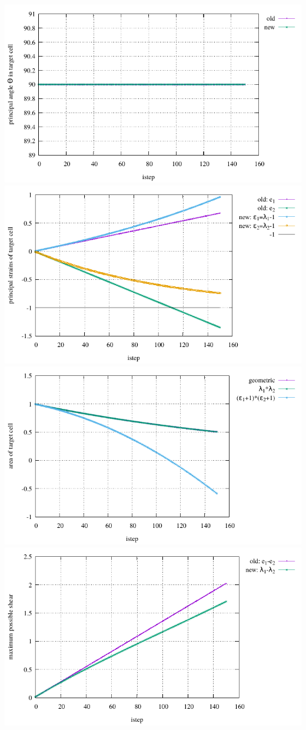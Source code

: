 \begin{center}
\includegraphics[width=9.cm]{python_codes/fieldstone_89/results/biaxial/principal_angle.pdf}
\includegraphics[width=9.cm]{python_codes/fieldstone_89/results/biaxial/principal_strains.pdf}\\
\includegraphics[width=9.cm]{python_codes/fieldstone_89/results/biaxial/area.pdf}
\includegraphics[width=9.cm]{python_codes/fieldstone_89/results/biaxial/maximum_shear.pdf}\\

\end{center}
